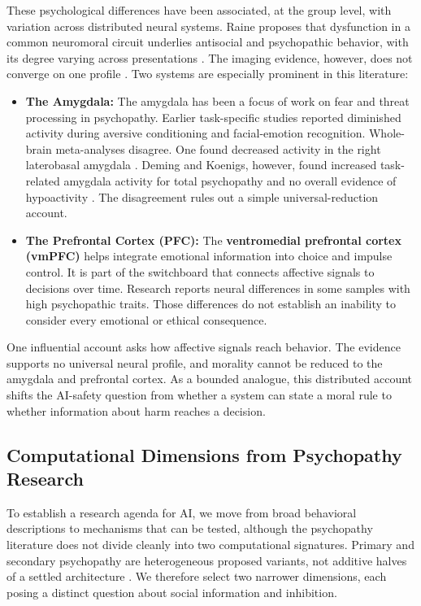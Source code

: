 \documentclass{article}
\begin{document}
These psychological differences have been associated, at the group level, with variation across distributed neural systems. Raine proposes that dysfunction in a common neuromoral circuit underlies antisocial and psychopathic behavior, with its degree varying across presentations \citep{ref51}. The imaging evidence, however, does not converge on one profile \citep{ref52, ref86}. Two systems are especially prominent in this literature:
\begin{itemize}
    \item \textbf{The Amygdala:} The amygdala has been a focus of work on fear and threat processing in psychopathy. Earlier task-specific studies reported diminished activity during aversive conditioning and facial-emotion recognition. Whole-brain meta-analyses disagree. One found decreased activity in the right laterobasal amygdala \citep{ref86}. Deming and Koenigs, however, found increased task-related amygdala activity for total psychopathy and no overall evidence of hypoactivity \citep{ref52}. The disagreement rules out a simple universal-reduction account.
    \item \textbf{The Prefrontal Cortex (PFC):} The \textbf{ventromedial prefrontal cortex (vmPFC)} helps integrate emotional information into choice and impulse control. It is part of the switchboard that connects affective signals to decisions over time. Research reports neural differences in some samples with high psychopathic traits. Those differences do not establish an inability to consider every emotional or ethical consequence.
\end{itemize}
One influential account asks how affective signals reach behavior. The evidence supports no universal neural profile, and morality cannot be reduced to the amygdala and prefrontal cortex. As a bounded analogue, this distributed account shifts the AI-safety question from whether a system can state a moral rule to whether information about harm reaches a decision.
\subsection{Computational Dimensions from Psychopathy Research}
To establish a research agenda for AI, we move from broad behavioral descriptions to mechanisms that can be tested, although the psychopathy literature does not divide cleanly into two computational signatures. Primary and secondary psychopathy are heterogeneous proposed variants, not additive halves of a settled architecture \citep{ref64}. We therefore select two narrower dimensions, each posing a distinct question about social information and inhibition.
\end{document}
